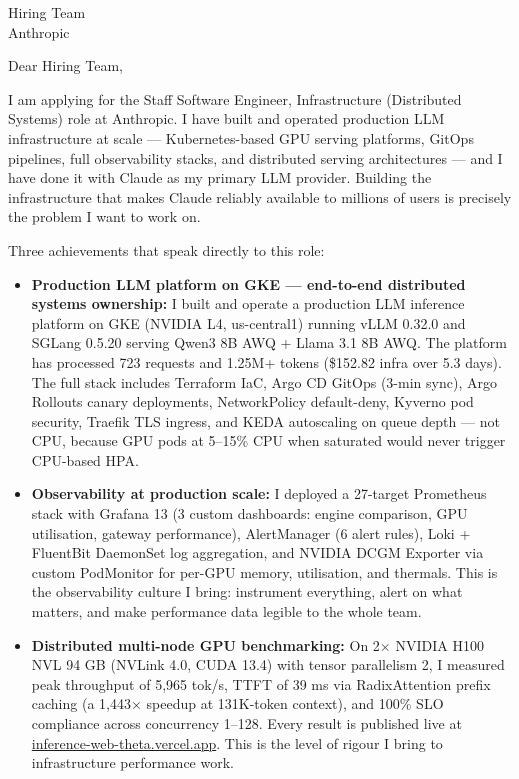 \documentclass[12pt,a4paper]{letter}
\date{\today}
\begin{document}
\begin{letter}{Hiring Team \\ Anthropic}

\opening{Dear Hiring Team,}

I am applying for the Staff Software Engineer, Infrastructure (Distributed Systems) role at Anthropic. I have built and operated production LLM infrastructure at scale — Kubernetes-based GPU serving platforms, GitOps pipelines, full observability stacks, and distributed serving architectures — and I have done it with Claude as my primary LLM provider. Building the infrastructure that makes Claude reliably available to millions of users is precisely the problem I want to work on.

Three achievements that speak directly to this role:

\begin{itemize}
  \item \textbf{Production LLM platform on GKE — end-to-end distributed systems ownership:} I built and operate a production LLM inference platform on GKE (NVIDIA L4, us-central1) running vLLM 0.32.0 and SGLang 0.5.20 serving Qwen3 8B AWQ + Llama 3.1 8B AWQ. The platform has processed 723 requests and 1.25M+ tokens (\$152.82 infra over 5.3 days). The full stack includes Terraform IaC, Argo CD GitOps (3-min sync), Argo Rollouts canary deployments, NetworkPolicy default-deny, Kyverno pod security, Traefik TLS ingress, and KEDA autoscaling on queue depth — not CPU, because GPU pods at 5--15\% CPU when saturated would never trigger CPU-based HPA.

  \item \textbf{Observability at production scale:} I deployed a 27-target Prometheus stack with Grafana 13 (3 custom dashboards: engine comparison, GPU utilisation, gateway performance), AlertManager (6 alert rules), Loki + FluentBit DaemonSet log aggregation, and NVIDIA DCGM Exporter via custom PodMonitor for per-GPU memory, utilisation, and thermals. This is the observability culture I bring: instrument everything, alert on what matters, and make performance data legible to the whole team.

  \item \textbf{Distributed multi-node GPU benchmarking:} On 2$\times$ NVIDIA H100 NVL 94 GB (NVLink 4.0, CUDA 13.4) with tensor parallelism 2, I measured peak throughput of 5,965 tok/s, TTFT of 39 ms via RadixAttention prefix caching (a 1,443$\times$ speedup at 131K-token context), and 100\% SLO compliance across concurrency 1--128. Every result is published live at \href{https://inference-web-theta.vercel.app/benchmarks/llm}{inference-web-theta.vercel.app}. This is the level of rigour I bring to infrastructure performance work.
\end{itemize}


\end{letter}
\end{document}
